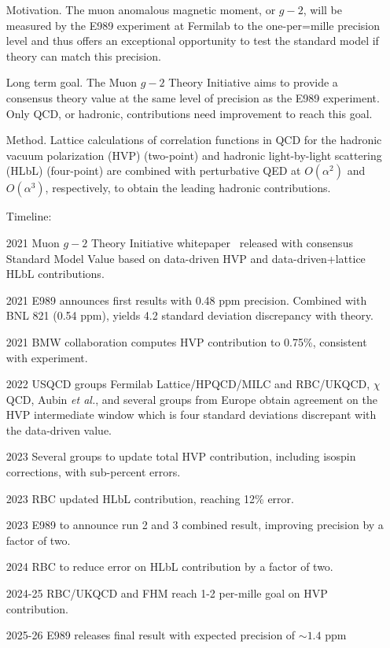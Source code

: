 \documentclass[prd,showpacs,showkeys,preprintnumbers,floatfix,
nofootinbib%
]{revtex4-2}
\begin{document}
\begin{itemize}
    \item[Motivation.] The muon anomalous magnetic moment, or $g-2$, will be measured by the E989 experiment at Fermilab to the one-per=mille precision level and thus offers an exceptional opportunity to test the standard model if theory can match this precision.
    \item[Long term goal.] The Muon $g-2$ Theory Initiative aims to provide a consensus theory value at the same level of precision as the E989 experiment. Only QCD, or hadronic, contributions need improvement to reach this goal.
\item[Method.] Lattice  calculations of correlation functions in QCD for the hadronic vacuum polarization (HVP) (two-point) and hadronic light-by-light scattering (HLbL) (four-point) are combined with perturbative QED at $O(\alpha^2)$ and $O(\alpha^3)$, respectively, to obtain the leading hadronic contributions.
\item[Timeline:]
    \item[2021] Muon $g-2$ Theory Initiative whitepaper~\cite{Aoyama:2020ynm} released with consensus Standard Model Value based on data-driven HVP and data-driven+lattice HLbL contributions.
    \item[2021] E989 announces first results with 0.48 ppm precision. Combined with BNL 821 (0.54 ppm), yields 4.2 standard deviation discrepancy with theory.
    \item[2021] BMW collaboration computes HVP contribution to 0.75\%, consistent with experiment. 
    \item[2022] USQCD groups Fermilab Lattice/HPQCD/MILC and RBC/UKQCD, $\chi$QCD, Aubin {\it et al.}, and several groups from Europe obtain agreement on the HVP intermediate window which is four standard deviations discrepant with the data-driven value.
    \item[2023] Several groups to update total HVP contribution, including isospin corrections, with sub-percent errors.
    \item[2023] RBC updated HLbL contribution, reaching 12\% error.
    \item[2023] E989 to announce run 2 and 3 combined result, improving precision by a factor of two.
    \item[2024] RBC to reduce error on HLbL contribution by a factor of two.
    \item[2024-25] RBC/UKQCD and FHM reach 1-2 per-mille goal on HVP contribution. 
    \item[2025-26] E989 releases final result with expected precision of $\sim 1.4$ ppm
\end{itemize}
\end{document}
